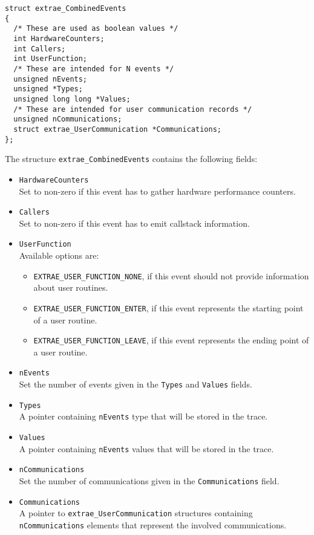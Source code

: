 \begin{verbatim}
struct extrae_CombinedEvents
{
  /* These are used as boolean values */
  int HardwareCounters;
  int Callers;
  int UserFunction;
  /* These are intended for N events */
  unsigned nEvents;
  unsigned *Types;
  unsigned long long *Values;
  /* These are intended for user communication records */
  unsigned nCommunications;
  struct extrae_UserCommunication *Communications;
};
\end{verbatim}

The structure {\tt extrae\_CombinedEvents} contains the following fields:
\begin{itemize}
	\item {\tt HardwareCounters}\\
	Set to non-zero if this event has to gather hardware performance counters.
	\item {\tt Callers}\\
	Set to non-zero if this event has to emit callstack information.
	\item {\tt UserFunction}\\
	Available options are:
	\begin{itemize}
		\item {\tt EXTRAE\_USER\_FUNCTION\_NONE}, if this event should not provide information about user routines.
		\item {\tt EXTRAE\_USER\_FUNCTION\_ENTER}, if this event represents the starting point of a user routine.
		\item {\tt EXTRAE\_USER\_FUNCTION\_LEAVE}, if this event represents the ending point of a user routine.
	\end{itemize}
	\item {\tt nEvents}\\
	Set the number of events given in the {\tt Types} and {\tt Values} fields.
	\item {\tt Types}\\
	A pointer containing {\tt nEvents} type that will be stored in the trace.
	\item {\tt Values}\\
	A pointer containing {\tt nEvents} values that will be stored in the trace.
	\item {\tt nCommunications}\\
	Set the number of communications given in the {\tt Communications} field.
	\item {\tt Communications}\\
	A pointer to {\tt extrae\_UserCommunication} structures containing {\tt nCommunications} elements that represent the involved communications.
\end{itemize}

